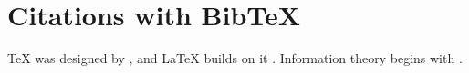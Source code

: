 \documentclass{article}
\begin{document}
\section*{Citations with BibTeX}
\TeX{} was designed by \citet{knuth1984}, and \LaTeX{} builds on it
\citep{lamport1994}. Information theory begins with \citet{shannon1948}.



\end{document}
